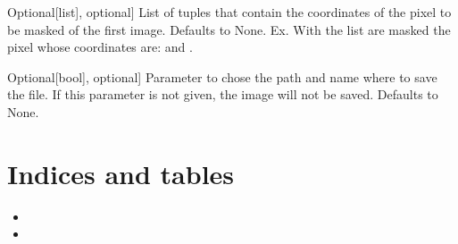 \documentclass[letterpaper,10pt,english]{sphinxmanual}
\begin{document}
\begin{fulllineitems}
\begin{description}
\sphinxlineitem{pixels\_to\_be\_masked}{[}Optional{[}list{]}, optional{]}
\sphinxAtStartPar
List of tuples that contain the coordinates of the pixel to be masked of the first 
image. Defaults to None. Ex. With the list \sphinxtitleref{{[}(1, 2), (3, 4){]}} are masked the pixel 
whose coordinates are:  and .

\sphinxlineitem{savepath}{[}Optional{[}bool{]}, optional{]}
\sphinxAtStartPar
Parameter to chose the path and name where to save the file. If this
parameter is not given, the image will not be saved. Defaults to None.

\end{description}

\end{fulllineitems}



\chapter{Indices and tables}
\label{\detokenize{index:indices-and-tables}}\begin{itemize}
\item {} 
\sphinxAtStartPar
{}

\item {} 
\sphinxAtStartPar
{}

\end{itemize}



\renewcommand{\indexname}{Index}
\printindex
\end{document}

